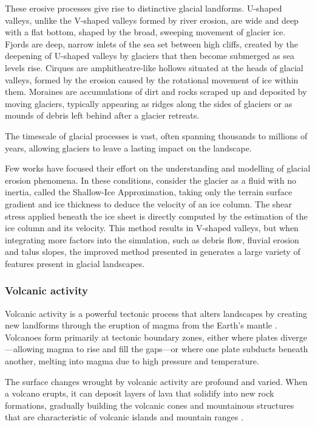 These erosive processes give rise to distinctive glacial landforms. U-shaped valleys, unlike the V-shaped valleys formed by river erosion, are wide and deep with a flat bottom, shaped by the broad, sweeping movement of glacier ice. Fjords are deep, narrow inlets of the sea set between high cliffs, created by the deepening of U-shaped valleys by glaciers that then become submerged as sea levels rise. Cirques are amphitheatre-like hollows situated at the heads of glacial valleys, formed by the erosion caused by the rotational movement of ice within them. Moraines are accumulations of dirt and rocks scraped up and deposited by moving glaciers, typically appearing as ridges along the sides of glaciers or as mounds of debris left behind after a glacier retreats.

The timescale of glacial processes is vast, often spanning thousands to millions of years, allowing glaciers to leave a lasting impact on the landscape.

Few works have focused their effort on the understanding and modelling of glacial erosion phenomena. In these conditions, \cite{Argudo2020} consider the glacier as a fluid with no inertia, called the Shallow-Ice Approximation, taking only the terrain surface gradient and ice thickness to deduce the velocity of an ice column. The shear stress applied beneath the ice sheet is directly computed by the estimation of the ice column and its velocity. This method results in V-shaped valleys, but when integrating more factors into the simulation, such as debris flow, fluvial erosion and talus slopes, the improved method presented in \cite{Cordonnier2023} generates a large variety of features present in glacial landscapes.

\subsubsection{Volcanic activity}
Volcanic activity is a powerful tectonic process that alters landscapes by creating new landforms through the eruption of magma from the Earth's mantle \cite{Ramalho2013}. Volcanoes form primarily at tectonic boundary zones, either where plates diverge—allowing magma to rise and fill the gaps—or where one plate subducts beneath another, melting into magma due to high pressure and temperature.

The surface changes wrought by volcanic activity are profound and varied. When a volcano erupts, it can deposit layers of lava that solidify into new rock formations, gradually building the volcanic cones and mountainous structures that are characteristic of volcanic islands and mountain ranges \cite{Woodroffe2003}.

